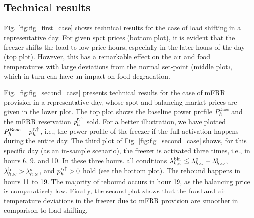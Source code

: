 \documentclass[11pt,a4paper]{article}
\begin{document}


\subsection{Technical results}
Fig. \ref{fig:fig_first_case} shows technical results for the case of load shifting in a representative day. For given spot prices (bottom plot), it is evident that the freezer shifts the load to low-price hours, especially in the later hours of the day (top plot). However, this has a remarkable effect on the air and food temperatures with large deviations from the normal set-point (middle plot), which in turn can have an impact on food degradation.


Fig. \ref{fig:fig_second_case} presents technical results for the case of mFRR  provision  in a representative day, whose spot and balancing market prices are given in the lower plot. The top plot shows the baseline power profile $P^{\text{Base}}_{h}$ and the mFRR reservation $p^{\rm{r}, \uparrow}_{h}$ sold. For a better illustration, we have plotted $P^{\text{Base}}_{h}-p^{\rm{r}, \uparrow}_{h}$, i.e., the power profile of the freezer if the full activation happens during the entire day. The third  plot of Fig. \ref{fig:fig_second_case} shows, for this specific day (as an in-sample scenario), the freezer is activated three times, i.e., in hours 6, 9, and 10. In these three hours, all conditions $\lambda_{h,\omega}^{\rm{bid}} \leq  \lambda_{h,\omega}^{\rm{b}} - \lambda_{h,\omega}^{\rm{s}}$, $ \lambda_{h,\omega}^{\rm{b}} > \lambda_{h,\omega}^{\rm{s}}$, and $p^{\rm{r},\uparrow}_{h} > 0$ hold (see the bottom plot). The rebound  happens in hours 11 to 19. The majority of rebound occurs in hour 19, as the balancing price is comparatively low. Finally, the second plot shows that the food and air temperature deviations in the freezer due to mFRR  provision  are smoother in comparison to  load shifting.


\end{document}
